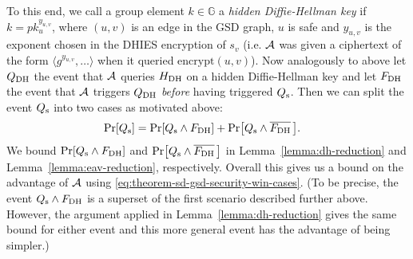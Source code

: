 To this end, we call a group element $k \in \mathbb{G}$ a \emph{hidden Diffie-Hellman key} if $k = pk_u^{y_{u, v}}$, where $(u, v)$ is an edge in the GSD graph, $u$ is safe and $y_{u, v}$ is the exponent chosen in the DHIES encryption of $s_v$ (i.e. $\mathcal{A}$ was given a ciphertext of the form $\langle g^{y_{u, v}}, \ldots\rangle$ when it queried $\mathrm{encrypt}(u, v)$). Now analogously to above let $Q_\mathrm{DH}$ the event that $\mathcal{A}$ queries $H_\mathrm{DH}$ on a hidden Diffie-Hellman key and let $F_\mathrm{DH}$ the event that $\mathcal{A}$ triggers $Q_\mathrm{DH}$ \emph{before} having triggered $Q_\mathrm{s}$. Then we can split the event $Q_\mathrm{s}$ into two cases as motivated above:
\begin{align*}
	\pr{\qs} & = \pr{\qs \land \fdh} + \pr{\qs \land \overline{\fdh}\,}.
\end{align*}
We bound $\pr{\qs \land \fdh}$ and $\pr{\qs \land \overline{\fdh} \,}$ in Lemma~\ref{lemma:dh-reduction} and Lemma~\ref{lemma:eav-reduction}, respectively. Overall this gives us a bound on the advantage of $\mathcal{A}$ using \eqref{eq:theorem-sd-gsd-security-win-cases}. (To be precise, the event $Q_\mathrm{s} \land F_\mathrm{DH}$ is a superset of the first scenario described further above. However, the argument applied in Lemma~\ref{lemma:dh-reduction} gives the same bound for either event and this more general event has the advantage of being simpler.)


